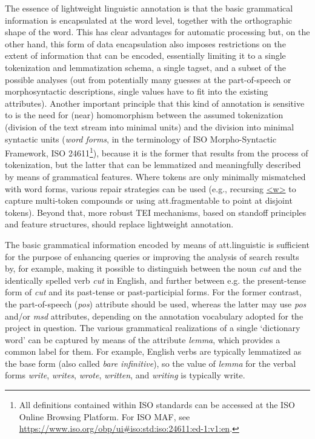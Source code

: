 The essence of lightweight linguistic annotation is that the basic grammatical information is encapsulated at the word level, together with the orthographic shape of the word. This has clear advantages for automatic processing but, on the other hand, this form of data encapsulation also imposes restrictions on the extent of information that can be encoded, essentially limiting it to a single tokenization and lemmatization schema, a single tagset, and a subset of the possible analyses (out from potentially many guesses at the part-of-speech or morphosyntactic descriptions, single values have to fit into the existing attributes). Another important principle that this kind of annotation is sensitive to is the need for (near) homomorphism between the assumed tokenization (division of the text stream into minimal units) and the division into minimal syntactic units (\textit{word forms}, in the terminology of ISO Morpho-Syntactic Framework, ISO 24611\footnote{All definitions contained within ISO standards can be accessed at the ISO Online Browsing Platform. For ISO MAF, see \url{https://www.iso.org/obp/ui\#iso:std:iso:24611:ed-1:v1:en}.}), because it is the former that results from the process of tokenization, but the latter that can be lemmatized and meaningfully described by means of grammatical features. Where tokens are only minimally mismatched with word forms, various repair strategies can be used (e.g., recursing \hyperref[TEI.w]{<w>} to capture multi-token compounds or using \textsf{att.fragmentable} to point at disjoint tokens). Beyond that, more robust TEI mechanisms, based on standoff principles and feature structures, should replace lightweight annotation.\par
The basic grammatical information encoded by means of \textsf{att.linguistic} is sufficient for the purpose of enhancing queries or improving the analysis of search results by, for example, making it possible to distinguish between the noun \textit{cut} and the identically spelled verb \textit{cut} in English, and further between e.g. the present-tense form of \textit{cut} and its past-tense or past-participial forms. For the former contrast, the part-of-speech ({\itshape pos}) attribute should be used, whereas the latter may use {\itshape pos} and/or {\itshape msd} attributes, depending on the annotation vocabulary adopted for the project in question. The various grammatical realizations of a single ‘dictionary word’ can be captured by means of the attribute {\itshape lemma}, which provides a common label for them. For example, English verbs are typically lemmatized as the base form (also called \textit{bare infinitive}), so the value of {\itshape lemma} for the verbal forms \textit{write}, \textit{writes}, \textit{wrote}, \textit{written}, and \textit{writing} is typically write.\par
